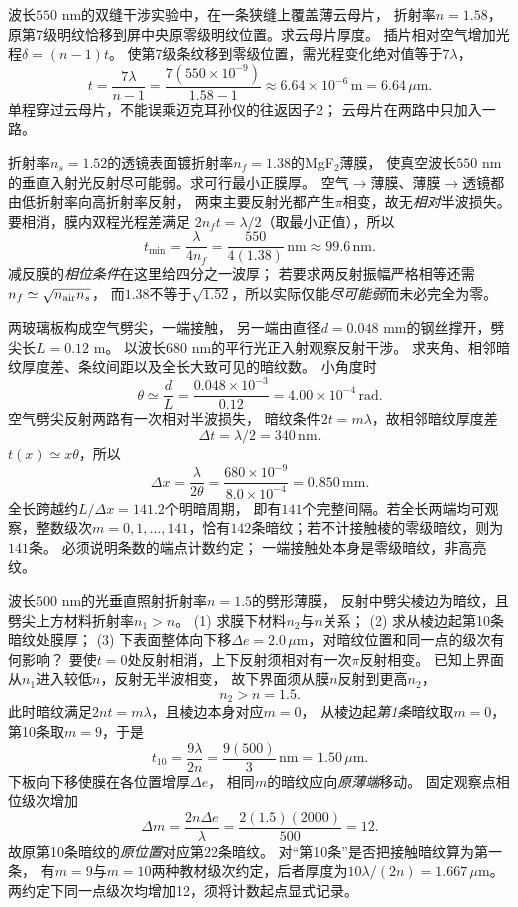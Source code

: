 \problemtext 波长$550$ nm的双缝干涉实验中，在一条狭缝上覆盖薄云母片，
折射率$n=1.58$，原第7级明纹恰移到屏中央原零级明纹位置。求云母片厚度。
\workings
插片相对空气增加光程$\delta=(n-1)t$。
使第7级条纹移到零级位置，需光程变化绝对值等于$7\lambda$，
\[
\boxed{t=\frac{7\lambda}{n-1}
=\frac{7(550\times10^{-9})}{1.58-1}
\approx6.64\times10^{-6}\,\mathrm m=6.64\,\mu\mathrm m}.
\]
\crosscheck 单程穿过云母片，不能误乘迈克耳孙仪的往返因子2；
云母片在两路中只加入一路。

\problemtext 折射率$n_s=1.52$的透镜表面镀折射率$n_f=1.38$的MgF$_2$薄膜，
使真空波长$550$ nm的垂直入射光反射尽可能弱。求可行最小正膜厚。
\workings
空气$\to$薄膜、薄膜$\to$透镜都由低折射率向高折射率反射，
两束主要反射光都产生$\pi$相变，故无\emph{相对}半波损失。
要相消，膜内双程光程差满足
$2n_ft=\lambda/2$（取最小正值），所以
\[
\boxed{t_{\min}=\frac{\lambda}{4n_f}
=\frac{550}{4(1.38)}\,\mathrm{nm}
\approx99.6\,\mathrm{nm}}.
\]
\crosscheck 减反膜的\emph{相位条件}在这里给四分之一波厚；
若要求两反射振幅严格相等还需$n_f\simeq\sqrt{n_{\rm air}n_s}$，
而$1.38$不等于$\sqrt{1.52}$，所以实际仅能\emph{尽可能弱}而未必完全为零。

\problemtext 两玻璃板构成空气劈尖，一端接触，
另一端由直径$d=0.048$ mm的钢丝撑开，劈尖长$L=0.12$ m。
以波长$680$ nm的平行光正入射观察反射干涉。
求夹角、相邻暗纹厚度差、条纹间距以及全长大致可见的暗纹数。
\workings
小角度时
\[
\boxed{\theta\simeq\frac{d}{L}
=\frac{0.048\times10^{-3}}{0.12}
=4.00\times10^{-4}\,\mathrm{rad}}.
\]
空气劈尖反射两路有一次相对半波损失，
暗纹条件$2t=m\lambda$，故相邻暗纹厚度差
\[
\boxed{\Delta t=\lambda/2=340\,\mathrm{nm}}.
\]
$t(x)\simeq x\theta$，所以
\[
\boxed{\Delta x=\frac{\lambda}{2\theta}
=\frac{680\times10^{-9}}{8.0\times10^{-4}}
=0.850\,\mathrm{mm}}.
\]
全长跨越约$L/\Delta x=141.2$个明暗周期，
即有$141$个完整间隔。若全长两端均可观察，整数级次$m=0,1,\ldots,141$，恰有$142$条暗纹；若不计接触棱的零级暗纹，则为$141$条。
\crosscheck 必须说明条数的端点计数约定；
一端接触处本身是零级暗纹，非高亮纹。

\problemtext 波长$500$ nm的光垂直照射折射率$n=1.5$的劈形薄膜，
反射中劈尖棱边为暗纹，且劈尖上方材料折射率$n_1>n$。
(1) 求膜下材料$n_2$与$n$关系；
(2) 求从棱边起第10条暗纹处膜厚；
(3) 下表面整体向下移$\Delta e=2.0\,\mu$m，对暗纹位置和同一点的级次有何影响？
\workings
要使$t=0$处反射相消，上下反射须相对有一次$\pi$反射相变。
已知上界面从$n_1$进入较低$n$，反射无半波相变，
故下界面须从膜$n$反射到更高$n_2$，
\[
\boxed{n_2>n=1.5}.
\]
此时暗纹满足$2nt=m\lambda$，且棱边本身对应$m=0$，
从棱边起\emph{第1条}暗纹取$m=0$，
第10条取$m=9$，于是
\[
\boxed{t_{10}=\frac{9\lambda}{2n}
=\frac{9(500)}{3}\,\mathrm{nm}=1.50\,\mu\mathrm m}.
\]
下板向下移使膜在各位置增厚$\Delta e$，
相同$m$的暗纹应向\emph{原薄端}移动。
固定观察点相位级次增加
\[
\boxed{\Delta m=\frac{2n\Delta e}{\lambda}
=\frac{2(1.5)(2000)}{500}=12}.
\]
故原第10条暗纹的\emph{原位置}对应第22条暗纹。
\crosscheck 对“第10条”是否把接触暗纹算为第一条，
有$m=9$与$m=10$两种教材级次约定，后者厚度为$10\lambda/(2n)=1.667\,\mu\mathrm m$。两约定下同一点级次均增加12，须将计数起点显式记录。

